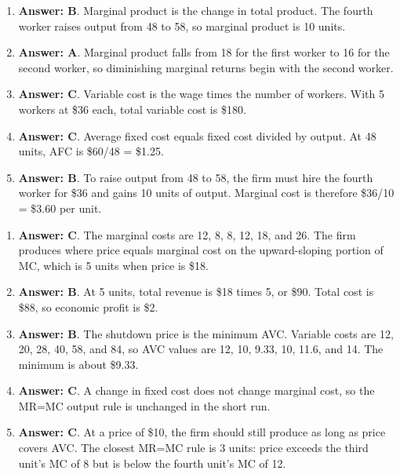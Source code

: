 \documentclass[10pt]{article}
\begin{document}
\begin{enumerate}[resume*=aps, leftmargin=*, itemsep=0.6em, topsep=0.2em, parsep=0pt]
\item \textbf{Answer: B}. Marginal product is the change in total product. The fourth worker raises output from 48 to 58, so marginal product is 10 units.
\item \textbf{Answer: A}. Marginal product falls from 18 for the first worker to 16 for the second worker, so diminishing marginal returns begin with the second worker.
\item \textbf{Answer: C}. Variable cost is the wage times the number of workers. With 5 workers at \$36 each, total variable cost is \$180.
\item \textbf{Answer: C}. Average fixed cost equals fixed cost divided by output. At 48 units, AFC is \$60/48 = \$1.25.
\item \textbf{Answer: B}. To raise output from 48 to 58, the firm must hire the fourth worker for \$36 and gains 10 units of output. Marginal cost is therefore \$36/10 = \$3.60 per unit.
\end{enumerate}
\begin{enumerate}[resume*=aps, leftmargin=*, itemsep=0.6em, topsep=0.2em, parsep=0pt]
\item \textbf{Answer: C}. The marginal costs are 12, 8, 8, 12, 18, and 26. The firm produces where price equals marginal cost on the upward-sloping portion of MC, which is 5 units when price is \$18.
\item \textbf{Answer: B}. At 5 units, total revenue is \$18 times 5, or \$90. Total cost is \$88, so economic profit is \$2.
\item \textbf{Answer: B}. The shutdown price is the minimum AVC. Variable costs are 12, 20, 28, 40, 58, and 84, so AVC values are 12, 10, 9.33, 10, 11.6, and 14. The minimum is about \$9.33.
\item \textbf{Answer: C}. A change in fixed cost does not change marginal cost, so the MR=MC output rule is unchanged in the short run.
\item \textbf{Answer: C}. At a price of \$10, the firm should still produce as long as price covers AVC. The closest MR=MC rule is 3 units: price exceeds the third unit's MC of 8 but is below the fourth unit's MC of 12.
\end{enumerate}
\end{document}
